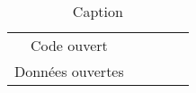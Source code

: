 \begin{table}[h]
\begin{tabular}{|*{5}{c|} }
        \hline



        Code ouvert &&&&\\
        Données ouvertes &&&&\\
        \hline
    \end{tabular}
    \caption{Caption}
    \label{tab:my_label}
\end{table}


